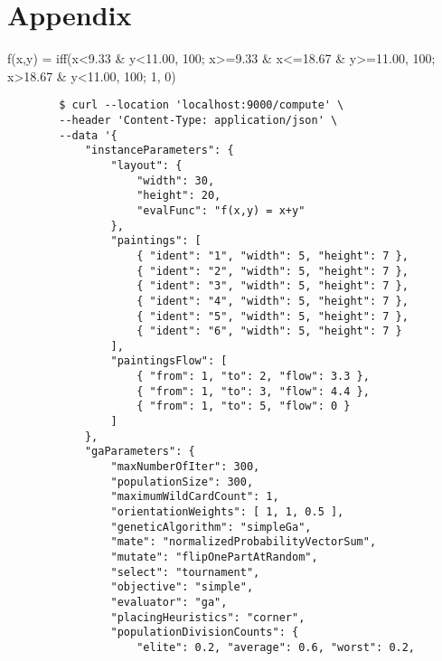\chapter{Appendix}\label{ch:appendix}

\begin{listing}[h!]
    f(x,y) = iff(x<9.33 \& y<11.00, 100; x>=9.33 \& x<=18.67 \& y>=11.00, 100; x>18.67 \& y<11.00, 100; 1, 0)
    \caption[Eval function used for biased sparse cluster instance]
    {Eval function used for biased sparse cluster instance in mXparser\footnotemark[1] format.}
    \label{lst:biased-sparse-cluster-eval-function}
\end{listing}


\begin{listing}[h!]
    \centering
    \begin{verbatim}
        $ curl --location 'localhost:9000/compute' \
        --header 'Content-Type: application/json' \
        --data '{
            "instanceParameters": {
                "layout": {
                    "width": 30,
                    "height": 20,
                    "evalFunc": "f(x,y) = x+y"
                },
                "paintings": [
                    { "ident": "1", "width": 5, "height": 7 },
                    { "ident": "2", "width": 5, "height": 7 },
                    { "ident": "3", "width": 5, "height": 7 },
                    { "ident": "4", "width": 5, "height": 7 },
                    { "ident": "5", "width": 5, "height": 7 },
                    { "ident": "6", "width": 5, "height": 7 }
                ],
                "paintingsFlow": [
                    { "from": 1, "to": 2, "flow": 3.3 },
                    { "from": 1, "to": 3, "flow": 4.4 },
                    { "from": 1, "to": 5, "flow": 0 }
                ]
            },
            "gaParameters": {
                "maxNumberOfIter": 300,
                "populationSize": 300,
                "maximumWildCardCount": 1,
                "orientationWeights": [ 1, 1, 0.5 ],
                "geneticAlgorithm": "simpleGa",
                "mate": "normalizedProbabilityVectorSum",
                "mutate": "flipOnePartAtRandom",
                "select": "tournament",
                "objective": "simple",
                "evaluator": "ga",
                "placingHeuristics": "corner",
                "populationDivisionCounts": {
                    "elite": 0.2, "average": 0.6, "worst": 0.2,

\end{verbatim}
\end{listing}
